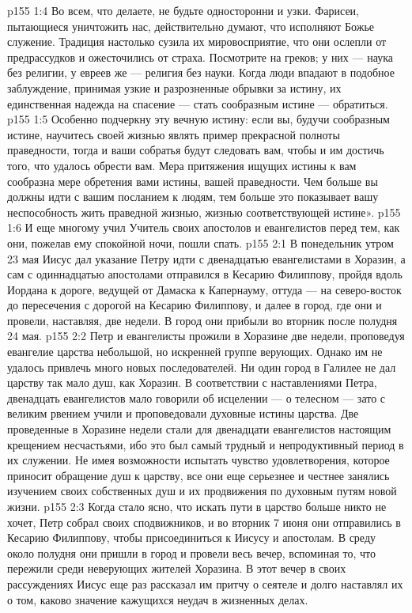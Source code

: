 \vs p155 1:4 Во всем, что делаете, не будьте односторонни и узки. Фарисеи, пытающиеся уничтожить нас, действительно думают, что исполняют Божье служение. Традиция настолько сузила их мировосприятие, что они ослепли от предрассудков и ожесточились от страха. Посмотрите на греков; у них --- наука без религии, у евреев же --- религия без науки. Когда люди впадают в подобное заблуждение, принимая узкие и разрозненные обрывки за истину, их единственная надежда на спасение --- стать сообразным истине --- обратиться.
\vs p155 1:5 Особенно подчеркну эту вечную истину: если вы, будучи сообразным истине, научитесь своей жизнью являть пример прекрасной полноты праведности, тогда и ваши собратья будут следовать вам, чтобы и им достичь того, что удалось обрести вам. Мера притяжения ищущих истины к вам сообразна мере обретения вами истины, вашей праведности. Чем больше вы должны идти с вашим посланием к людям, тем больше это показывает вашу неспособность жить праведной жизнью, жизнью соответствующей истине».
\vs p155 1:6 И еще многому учил Учитель своих апостолов и евангелистов перед тем, как они, пожелав ему спокойной ночи, пошли спать.
\vs p155 2:1 В понедельник утром 23 мая Иисус дал указание Петру идти с двенадцатью евангелистами в Хоразин, а сам с одиннадцатью апостолами отправился в Кесарию Филиппову, пройдя вдоль Иордана к дороге, ведущей от Дамаска к Капернауму, оттуда --- на северо\hyp{}восток до пересечения с дорогой на Кесарию Филиппову, и далее в город, где они и провели, наставляя, две недели. В город они прибыли во вторник после полудня 24 мая.
\vs p155 2:2 Петр и евангелисты прожили в Хоразине две недели, проповедуя евангелие царства небольшой, но искренней группе верующих. Однако им не удалось привлечь много новых последователей. Ни один город в Галилее не дал царству так мало душ, как Хоразин. В соответствии с наставлениями Петра, двенадцать евангелистов мало говорили об исцелении --- о телесном --- зато с великим рвением учили и проповедовали духовные истины царства. Две проведенные в Хоразине недели стали для двенадцати евангелистов настоящим крещением несчастьями, ибо это был самый трудный и непродуктивный период в их служении. Не имея возможности испытать чувство удовлетворения, которое приносит обращение душ к царству, все они еще серьезнее и честнее занялись изучением своих собственных душ и их продвижения по духовным путям новой жизни.
\vs p155 2:3 Когда стало ясно, что искать пути в царство больше никто не хочет, Петр собрал своих сподвижников, и во вторник 7 июня они отправились в Кесарию Филиппову, чтобы присоединиться к Иисусу и апостолам. В среду около полудня они пришли в город и провели весь вечер, вспоминая то, что пережили среди неверующих жителей Хоразина. В этот вечер в своих рассуждениях Иисус еще раз рассказал им притчу о сеятеле и долго наставлял их о том, каково значение кажущихся неудач в жизненных делах.
